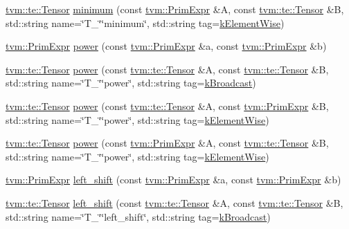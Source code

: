\begin{DoxyCompactItemize}
\item 
\hyperlink{classtvm_1_1te_1_1Tensor}{tvm\+::te\+::\+Tensor} \hyperlink{namespacetopi_a01fdc8ce8ff2295e10cb89de23c3da98}{minimum} (const \hyperlink{classtvm_1_1PrimExpr}{tvm\+::\+Prim\+Expr} \&A, const \hyperlink{classtvm_1_1te_1_1Tensor}{tvm\+::te\+::\+Tensor} \&B, std\+::string name=\char`\"{}T\+\_\+\char`\"{}\char`\"{}minimum\char`\"{}, std\+::string tag=\hyperlink{namespacetopi_ac1b34ed59d38a5f5338bee6b2cad42be}{k\+Element\+Wise})
\item 
\hyperlink{classtvm_1_1PrimExpr}{tvm\+::\+Prim\+Expr} \hyperlink{namespacetopi_a042879ca152f316c9d19f941dbdf7582}{power} (const \hyperlink{classtvm_1_1PrimExpr}{tvm\+::\+Prim\+Expr} \&a, const \hyperlink{classtvm_1_1PrimExpr}{tvm\+::\+Prim\+Expr} \&b)
\item 
\hyperlink{classtvm_1_1te_1_1Tensor}{tvm\+::te\+::\+Tensor} \hyperlink{namespacetopi_ab097639aeae60327021acd270dc4d0d2}{power} (const \hyperlink{classtvm_1_1te_1_1Tensor}{tvm\+::te\+::\+Tensor} \&A, const \hyperlink{classtvm_1_1te_1_1Tensor}{tvm\+::te\+::\+Tensor} \&B, std\+::string name=\char`\"{}T\+\_\+\char`\"{}\char`\"{}power\char`\"{}, std\+::string tag=\hyperlink{namespacetopi_a794b9155e9ba9d1c9c42a1cff1fb645f}{k\+Broadcast})
\item 
\hyperlink{classtvm_1_1te_1_1Tensor}{tvm\+::te\+::\+Tensor} \hyperlink{namespacetopi_ab8c5863a2b0ac76f71ef0004c04d4aa7}{power} (const \hyperlink{classtvm_1_1te_1_1Tensor}{tvm\+::te\+::\+Tensor} \&A, const \hyperlink{classtvm_1_1PrimExpr}{tvm\+::\+Prim\+Expr} \&B, std\+::string name=\char`\"{}T\+\_\+\char`\"{}\char`\"{}power\char`\"{}, std\+::string tag=\hyperlink{namespacetopi_ac1b34ed59d38a5f5338bee6b2cad42be}{k\+Element\+Wise})
\item 
\hyperlink{classtvm_1_1te_1_1Tensor}{tvm\+::te\+::\+Tensor} \hyperlink{namespacetopi_af600fbd4945257ba8de0ac4f17e89506}{power} (const \hyperlink{classtvm_1_1PrimExpr}{tvm\+::\+Prim\+Expr} \&A, const \hyperlink{classtvm_1_1te_1_1Tensor}{tvm\+::te\+::\+Tensor} \&B, std\+::string name=\char`\"{}T\+\_\+\char`\"{}\char`\"{}power\char`\"{}, std\+::string tag=\hyperlink{namespacetopi_ac1b34ed59d38a5f5338bee6b2cad42be}{k\+Element\+Wise})
\item 
\hyperlink{classtvm_1_1PrimExpr}{tvm\+::\+Prim\+Expr} \hyperlink{namespacetopi_a78a4d7cbe5668db729e1acf831c79034}{left\+\_\+shift} (const \hyperlink{classtvm_1_1PrimExpr}{tvm\+::\+Prim\+Expr} \&a, const \hyperlink{classtvm_1_1PrimExpr}{tvm\+::\+Prim\+Expr} \&b)
\item 
\hyperlink{classtvm_1_1te_1_1Tensor}{tvm\+::te\+::\+Tensor} \hyperlink{namespacetopi_a8364df3a53ff3b0cc8226bf6c45e529a}{left\+\_\+shift} (const \hyperlink{classtvm_1_1te_1_1Tensor}{tvm\+::te\+::\+Tensor} \&A, const \hyperlink{classtvm_1_1te_1_1Tensor}{tvm\+::te\+::\+Tensor} \&B, std\+::string name=\char`\"{}T\+\_\+\char`\"{}\char`\"{}left\+\_\+shift\char`\"{}, std\+::string tag=\hyperlink{namespacetopi_a794b9155e9ba9d1c9c42a1cff1fb645f}{k\+Broadcast})

\end{DoxyCompactItemize}
